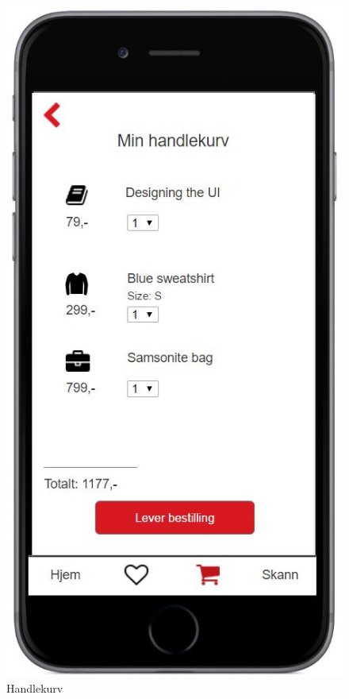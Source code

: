 \begin{figure}[H]
\includegraphics[scale=0.55]{images/axurebilder/handlekurv}
\centering %
\caption{Handlekurv}
\label{fig:handlekurv}
\end{figure}

